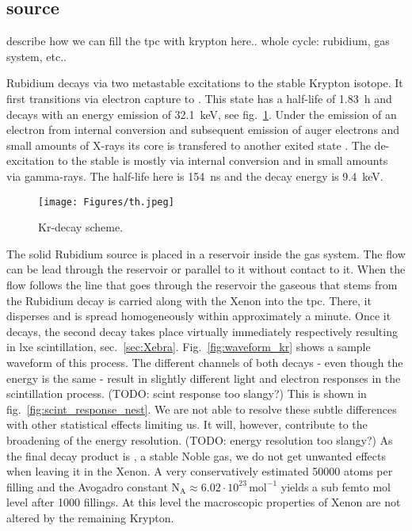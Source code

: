 
\FloatBarrier
\subsection{source}
\label{ssec:source}
\FloatBarrier


describe how we can fill the tpc with krypton here.. whole cycle: rubidium, gas system, etc..


Rubidium  decays via two metastable excitations to the stable  Krypton isotope.
It first transitions via electron capture to .
This state has a half-life of \SI{1.83}{\hour} and decays with an energy emission of \SI{32.1}{\kilo\electronvolt}, see fig.~\ref{fig:scheme_kr}.
Under the emission of an electron from internal conversion and subsequent emission of auger electrons and small amounts of X-rays its core is transfered to another exited state .
The de-excitation to the stable  is mostly via internal conversion and in small amounts via gamma-rays.
The half-life here is \SI{154}{\nano\s} and the decay energy is \SI{9.4}{\kilo\electronvolt}.


\begin{figure}
    \centering
    \texttt{[image: Figures/th.jpeg]}  %
    \caption[Decay Scheme Krypton]{Kr-decay scheme\cite{kr_scheme}.}
    \label{fig:scheme_kr}
\end{figure}

The solid Rubidium source is placed in a reservoir inside the gas system.
The flow can be lead through the reservoir or parallel to it without contact to it.
When the flow follows the line that goes through the reservoir the gaseous  that stems from the Rubidium decay is carried along with the Xenon into the \gls{tpc}.
There, it disperses and is spread homogeneously within approximately a minute.
Once it decays, the second decay takes place virtually immediately respectively resulting in \gls{lxe} scintillation, sec.~\ref{sec:Xebra}.
Fig.~\ref{fig:waveform_kr} shows a sample waveform of this process.
The different channels of both decays - even though the energy is the same - result in slightly different light and electron responses in the scintillation process. (TODO: scint response too slangy?)
This is shown in fig.~\ref{fig:scint_response_nest}.
We are not able to resolve these subtle differences with other statistical effects limiting us.
It will, however, contribute to the broadening of the energy resolution. (TODO: energy resolution too slangy?)
As the final decay product is , a stable Noble gas, we do not get unwanted effects when leaving it in the Xenon.
A very conservatively estimated \SI{50000}{} atoms per filling and the Avogadro constant $ \mathrm{N}_\mathrm{A} \approx 6.02\cdot10^{23}\,\mathrm{mol}^{-1} $ yields a sub femto mol level after 1000 fillings.
At this level the macroscopic properties of Xenon are not altered by the remaining Krypton.


